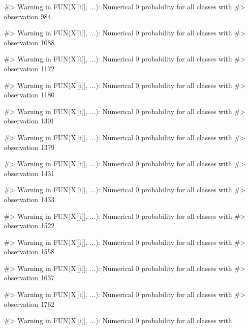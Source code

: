 \begin{Schunk}
\begin{Soutput}
#> Warning in FUN(X[[i]], ...): Numerical 0 probability for all classes with
#> observation 984
\end{Soutput}
\begin{Soutput}
#> Warning in FUN(X[[i]], ...): Numerical 0 probability for all classes with
#> observation 1088
\end{Soutput}
\begin{Soutput}
#> Warning in FUN(X[[i]], ...): Numerical 0 probability for all classes with
#> observation 1172
\end{Soutput}
\begin{Soutput}
#> Warning in FUN(X[[i]], ...): Numerical 0 probability for all classes with
#> observation 1180
\end{Soutput}
\begin{Soutput}
#> Warning in FUN(X[[i]], ...): Numerical 0 probability for all classes with
#> observation 1301
\end{Soutput}
\begin{Soutput}
#> Warning in FUN(X[[i]], ...): Numerical 0 probability for all classes with
#> observation 1379
\end{Soutput}
\begin{Soutput}
#> Warning in FUN(X[[i]], ...): Numerical 0 probability for all classes with
#> observation 1431
\end{Soutput}
\begin{Soutput}
#> Warning in FUN(X[[i]], ...): Numerical 0 probability for all classes with
#> observation 1433
\end{Soutput}
\begin{Soutput}
#> Warning in FUN(X[[i]], ...): Numerical 0 probability for all classes with
#> observation 1522
\end{Soutput}
\begin{Soutput}
#> Warning in FUN(X[[i]], ...): Numerical 0 probability for all classes with
#> observation 1558
\end{Soutput}
\begin{Soutput}
#> Warning in FUN(X[[i]], ...): Numerical 0 probability for all classes with
#> observation 1637
\end{Soutput}
\begin{Soutput}
#> Warning in FUN(X[[i]], ...): Numerical 0 probability for all classes with
#> observation 1762
\end{Soutput}
\begin{Soutput}
#> Warning in FUN(X[[i]], ...): Numerical 0 probability for all classes with

\end{Soutput}
\end{Schunk}
